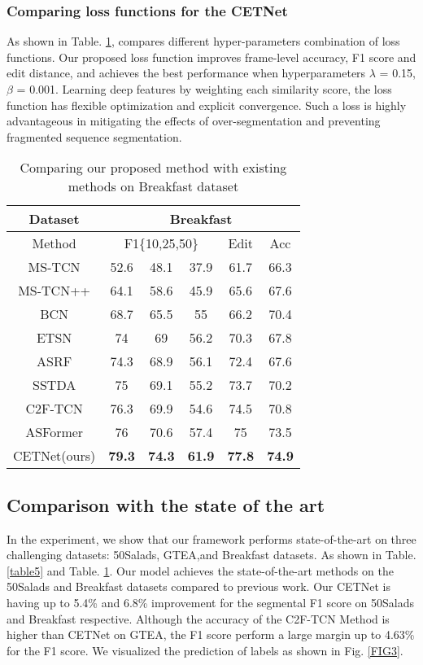 \documentclass[runningheads]{llncs}
\begin{document}
\subsubsection{Comparing loss functions for the CETNet}
\par{
	As shown in Table. \ref{table4}, compares different hyper-parameters combination of loss functions. Our proposed loss function improves frame-level accuracy, F1 score and edit distance, and achieves the best performance when hyperparameters $\lambda $ = 0.15, $\beta $ = 0.001. Learning deep features by weighting each similarity score, the loss function has flexible optimization and explicit convergence. Such a loss is highly advantageous in mitigating the effects of over-segmentation and preventing fragmented sequence segmentation.
}
\begin{table}[ht]
	\centering
	\caption{Comparing our proposed method with existing methods on Breakfast dataset}
	\setlength{\tabcolsep}{2.5mm}
	\begin{tabular}{cccccc}
		\toprule
		Dataset & \multicolumn{5}{c}{Breakfast} \\
		\midrule
		Method & \multicolumn{3}{c}{F1\{10,25,50\}} & Edit  & Acc \\
		\midrule
		MS-TCN\cite{farha2019ms} & 52.6  & 48.1  & 37.9  & 61.7  & 66.3 \\
		MS-TCN++\cite{li2020ms} & 64.1  & 58.6  & 45.9  & 65.6  & 67.6 \\
		BCN\cite{wang2020boundary}   & 68.7  & 65.5  & 55    & 66.2  & 70.4 \\
		ETSN\cite{li2021efficient}  & 74    & 69    & 56.2  & 70.3  & 67.8 \\
		ASRF\cite{ishikawa2021alleviating}  & 74.3  & 68.9  & 56.1  & 72.4  & 67.6 \\
		SSTDA\cite{chen2020action} & 75    & 69.1  & 55.2  & 73.7  & 70.2 \\
		C2F-TCN\cite{singhania2021coarse} & 76.3  & 69.9  & 54.6  & 74.5  & 70.8 \\
		ASFormer\cite{yi2021asformer} & 76    & 70.6  & 57.4  & 75    & 73.5 \\
		CETNet(ours) & \textbf{79.3} & \textbf{74.3} & \textbf{61.9} & \textbf{77.8} & \textbf{74.9} \\
		\bottomrule
	\end{tabular}\label{table4}\end{table}

\subsection{Comparison with the state of the art}
\par{
	In the experiment, we show that our framework performs state-of-the-art on three challenging datasets: 50Salads, GTEA,and Breakfast datasets. As shown in Table. \ref{table5} and Table. \ref{table4}. Our model achieves the state-of-the-art methods on the 50Salads and Breakfast datasets compared to previous work. Our CETNet is having up to 5.4\% and 6.8\% improvement for the segmental F1 score on 50Salads and Breakfast respective. Although the accuracy of the C2F-TCN Method is higher than CETNet on GTEA, the F1 score perform a large margin up to 4.63\% for the F1 score. We visualized the prediction of labels as shown in Fig. \ref{FIG3}.
}
\end{document}
